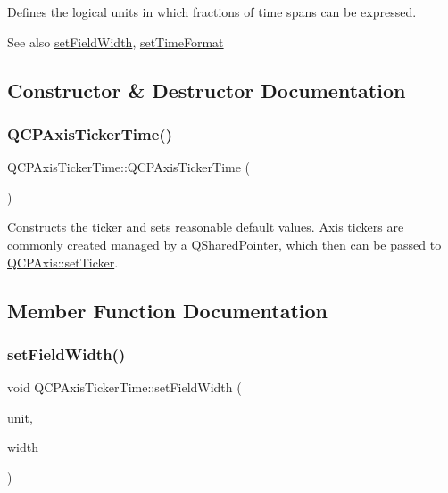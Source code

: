 Defines the logical units in which fractions of time spans can be expressed.

\begin{DoxySeeAlso}{See also}
\hyperlink{class_q_c_p_axis_ticker_time_adc13e54fc969be98a5c0e3fa0dbaa293}{set\+Field\+Width}, \hyperlink{class_q_c_p_axis_ticker_time_a2f30b6e5125bce4256be9ce3177088ea}{set\+Time\+Format} 
\end{DoxySeeAlso}


\subsection{Constructor \& Destructor Documentation}
\mbox{\label{class_q_c_p_axis_ticker_time_a5145aac1d2117fdac411d9e8552cc41b}} 
\subsubsection{\texorpdfstring{Q\+C\+P\+Axis\+Ticker\+Time()}{QCPAxisTickerTime()}}
{\footnotesize\ttfamily Q\+C\+P\+Axis\+Ticker\+Time\+::\+Q\+C\+P\+Axis\+Ticker\+Time (\begin{DoxyParamCaption}{ }\end{DoxyParamCaption})}

Constructs the ticker and sets reasonable default values. Axis tickers are commonly created managed by a Q\+Shared\+Pointer, which then can be passed to \hyperlink{class_q_c_p_axis_a4ee03fcd2c74d05cd1a419b9af5cfbdc}{Q\+C\+P\+Axis\+::set\+Ticker}. 

\subsection{Member Function Documentation}
\mbox{\label{class_q_c_p_axis_ticker_time_adc13e54fc969be98a5c0e3fa0dbaa293}} 
\subsubsection{\texorpdfstring{set\+Field\+Width()}{setFieldWidth()}}
{\footnotesize\ttfamily void Q\+C\+P\+Axis\+Ticker\+Time\+::set\+Field\+Width (\begin{DoxyParamCaption}\item[{\hyperlink{class_q_c_p_axis_ticker_time_a5c48ded8c6d3a1aca9b68219469fea3e}{Q\+C\+P\+Axis\+Ticker\+Time\+::\+Time\+Unit}}]{unit,  }\item[{int}]{width }\end{DoxyParamCaption})}

